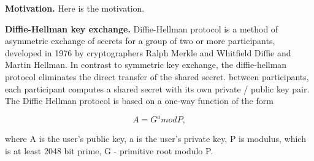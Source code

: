 \textbf{Motivation.} Here is the motivation.

\textbf{Diffie-Hellman key exchange.} Diffie-Hellman protocol is a method of asymmetric exchange of secrets for
a group of two or more participants,
developed in 1976 by cryptographers Ralph Merkle and Whitfield Diffie and Martin Hellman.
In contrast to symmetric key exchange, the diffie-hellman protocol eliminates the direct transfer of the shared secret.
between participants, each participant computes a shared secret with its own private / public key pair.
The Diffie Hellman protocol is based on a one-way function of the form

\[
    A = G ^ a mod P,
\]

where A is the user's public key, a is the user's private key, P is modulus, which is at least 2048 bit prime,
G - primitive root modulo P.

